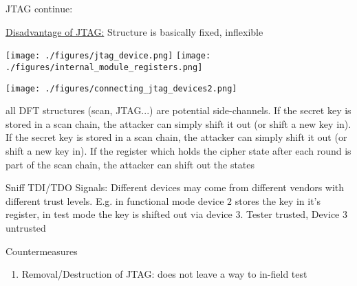 \documentclass[landscape, a4paper]{article}
\begin{document}
\begin{minipage}[t]{0.2\linewidth}
	\begin{betterlist}
		\item \alert{JTAG continue:}
		\begin{betterlist}
			\item \underline{Disadvantage of JTAG:} Structure is basically fixed, inflexible
		\end{betterlist}

		\begin{minipage}[b]{0.3\linewidth}
			\texttt{[image: ./figures/jtag\_device.png]}
			\texttt{[image: ./figures/internal\_module\_registers.png]}
		\end{minipage}
		\begin{minipage}[b]{0.7\linewidth}
			\texttt{[image: ./figures/connecting\_jtag\_devices2.png]}
		\end{minipage}
	\end{betterlist}
	\begin{betterlist}
		\item all DFT structures (scan, JTAG...) are potential side-channels. If the secret key is stored in a scan chain, the attacker can simply shift it out (or shift a new key in). If the secret key is stored in a scan chain, the attacker can simply shift it out (or shift a new key in). If the register which holds the cipher state after each round is part of the scan chain, the attacker can shift out the states
		\item \alert{Sniff TDI/TDO Signals:} Different devices may come from different vendors with different trust levels. E.g. in functional mode device $2$ stores the key in it's register, in test mode the key is shifted out via device $3$. Tester trusted, Device $3$ untrusted
		\item \alert{Countermeasures}
		\begin{enumerate}
			\item \alert{Removal/Destruction of JTAG:} does not leave a way to in-field test
\end{enumerate}
\end{betterlist}
\end{minipage}
\end{document}
